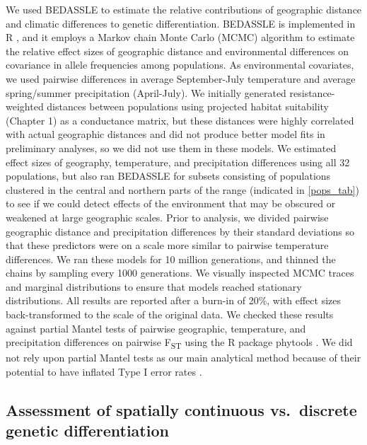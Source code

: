 \documentclass{article}
\begin{document}
We used BEDASSLE \citep{bradburd2013disentangling} to estimate the relative contributions of geographic distance and climatic differences to genetic differentiation. BEDASSLE is implemented in R \citep{Rcore}, and it employs a Markov chain Monte Carlo (MCMC) algorithm to estimate the relative effect sizes of geographic distance and environmental differences on covariance in allele frequencies among populations. As environmental covariates, we used pairwise differences in average September-July temperature and average spring/summer precipitation (April-July). We initially generated resistance-weighted distances between populations using projected habitat suitability (Chapter 1) as a conductance matrix, but these distances were highly correlated with actual geographic distances and did not produce better model fits in preliminary analyses, so we did not use them in these models. We estimated effect sizes of geography, temperature, and precipitation differences using all 32 populations, but also ran BEDASSLE for subsets consisting of populations clustered in the central and northern parts of the range (indicated in \autoref{pops_tab}) to see if we could detect effects of the environment that may be obscured or weakened at large geographic scales. Prior to analysis, we divided pairwise geographic distance and precipitation differences by their standard deviations so that these predictors were on a scale more similar to pairwise temperature differences. We ran these models for 10 million generations, and thinned the chains by sampling every 1000 generations. We visually inspected MCMC traces and marginal distributions to ensure that models reached stationary distributions. All results are reported after a burn-in of 20\%, with effect sizes back-transformed to the scale of the original data. We checked these results against partial Mantel tests of pairwise geographic, temperature, and precipitation differences on pairwise F\textsubscript{ST} using the R package phytools \citep{phytools}. We did not rely upon partial Mantel tests as our main analytical method because of their potential to have inflated Type I error rates \citep{guillot2013dismantling}.

\subsection*{Assessment of spatially continuous vs.\ discrete genetic differentiation}
\end{document}
